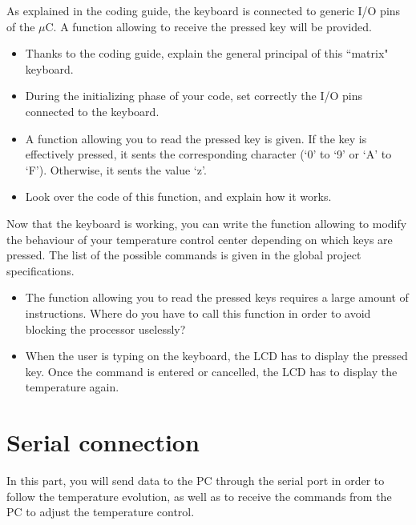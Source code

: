 \documentclass[11pt,a4paper]{article}
\theoremstyle{definition}%
\begin{document}
As explained in the coding guide, the keyboard is connected to generic I/O pins of the $\mu$C.
A function allowing to receive the pressed key will be provided.


\begin{itemize}
	\item Thanks to the coding guide, explain the general principal of this ``matrix" keyboard.
	\item During the initializing phase of your code, set correctly the I/O pins connected to the keyboard.
	\item A function allowing you to read the pressed key is given.
	If the key is effectively pressed, it sents the corresponding character (‘0’ to ‘9’ or ‘A’ to ‘F’).
	Otherwise, it sents the value ‘z’.
	\item Look over the code of this function, and explain how it works.
\end{itemize}

Now that the keyboard is working, you can write the function allowing to modify the behaviour of your temperature control center depending on which keys are pressed.
The list of the possible commands is given in the global project specifications.
\begin{itemize}
	\item The function allowing you to read the pressed keys requires a large amount of instructions.
	Where do you have to call this function in order to avoid blocking the processor uselessly?
	\item When the user is typing on the keyboard, the LCD has to display the pressed key.
	Once the command is entered or cancelled, the LCD has to display the temperature again.
\end{itemize}









\section{Serial connection}
In this part, you will send data to the PC through the serial port in order to follow the temperature evolution, as well as to receive the commands from the PC to adjust the temperature control.
\end{document}
